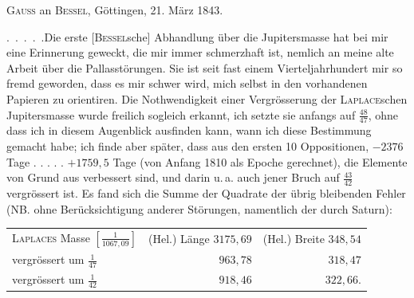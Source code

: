 \par{}\bigskip
\begin{center}
\textsc{Gauss} an \textsc{Bessel}, Göttingen, 21. März 1843.
\end{center}
\noindent\hspace*{\parindent}\mbox{. . . . .}\quad Die erste [\textsc{Bessel}sche] Abhandlung über die Jupitersmasse hat bei mir eine Erinnerung geweckt, die mir immer schmerzhaft ist, nemlich an meine alte Arbeit über die Pallasstörungen. Sie ist seit fast einem Vierteljahrhundert mir so fremd geworden, dass es mir schwer wird, mich selbst in den vorhandenen Papieren zu orientiren. Die Nothwendigkeit einer Vergrösserung der \textsc{Laplace}schen Jupitersmasse wurde freilich sogleich erkannt, ich setzte sie anfangs auf \(\frac{48}{47}\), ohne dass ich in diesem Augenblick ausfinden kann, wann ich diese Bestimmung gemacht habe; ich finde aber später, dass aus den ersten 10 Oppositionen, \(-2376\) Tage . . . . . \(+1759{,}5\) Tage (von Anfang 1810 als Epoche gerechnet), die Elemente von Grund aus verbessert sind, und darin u.\,a. auch jener Bruch auf \(\frac{43}{42}\) vergrössert ist. Es fand sich die Summe der Quadrate der übrig bleibenden Fehler (NB. ohne Berücksichtigung anderer Störungen, namentlich der durch Saturn):
\begin{center}
\renewcommand{\arraystretch}{1.3}
\begin{tabular}{@{}lrr@{}}
\textsc{Laplaces} Masse \(\left[\frac{1}{1067{,}09}\right]\) & (Hel.) Länge \(3175{,}69\) & (Hel.) Breite \(348{,}54\) \\
vergrössert um \(\frac{1}{47}\) & \(963{,}78\) & \(318{,}47\) \\
vergrössert um \(\frac{1}{42}\) & \(918{,}46\) & \(322{,}66\).
\end{tabular}
\end{center}
